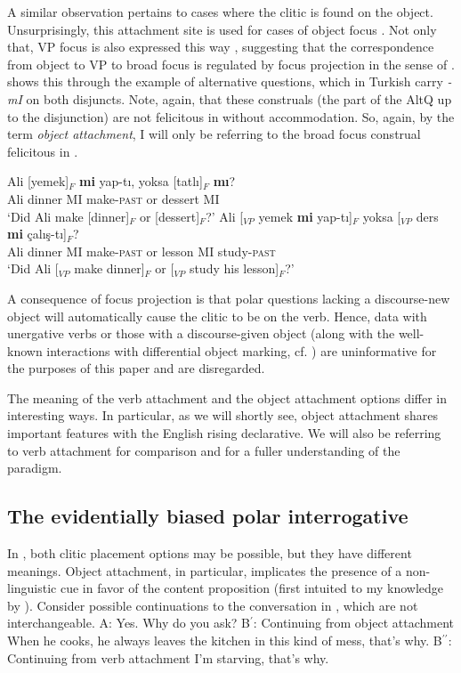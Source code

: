 \documentclass[output=paper,colorlinks,citecolor=brown]{langscibook}
\begin{document}
A similar observation pertains to cases where the clitic is found on the object. Unsurprisingly, this attachment site is used for cases of object focus . Not only that, VP focus is also expressed this way , suggesting that the correspondence from object to VP to broad focus is regulated by focus projection in the sense of \citet{selkirk95}.  shows this through the example of alternative questions, which in Turkish carry \textit{-mI} on both disjuncts. Note, again, that these construals (the part of the AltQ up to the disjunction) are not felicitous in  without accommodation. So, again, by the term \textit{object attachment}, I will only be referring to the broad focus construal felicitous in .

 \ea\label{ex:11:6}
 \ea\label{ex:11:6a}
 \gll Ali  [yemek]$_{F}$  \textbf{mi} yap-tı, yoksa [tatlı]$_{F}$ \textbf{mı}?\\
 Ali dinner MI  make-\textsc{past} or dessert MI\\
\glt `Did Ali make [dinner]$_F$ or [dessert]$_F$?' 
\ex\label{ex:11:6b}
\gll Ali [$_{VP}$ yemek \textbf{mi} yap-tı]$_{F}$ yoksa [$_{VP}$ ders \textbf{mi} \c{c}alış-tı]$_{F}$?\\
Ali {} dinner MI make-\textsc{past} or {} lesson MI study-\textsc{past}\\
\glt `Did Ali [$_{VP}$ make dinner]$_F$ or [$_{VP}$ study his lesson]$_F$?' 
\z
\z

 A consequence of focus projection is that polar questions lacking a discourse-new object will automatically cause the clitic to be on the verb. Hence, data with unergative verbs or those with a discourse-given object (along with the well-known interactions with differential object marking, cf. \citealt{ozge-indef}) are uninformative for the purposes of this paper and are disregarded.  

The meaning of the verb attachment and the object attachment options differ in interesting ways. In particular, as we will shortly see, object attachment shares important features with the English rising declarative. We will also be referring to verb attachment for comparison and for a fuller understanding of the paradigm. 

\subsection{The evidentially biased polar interrogative}\label{sec:11:2:2}

In , both clitic placement options may be possible, but they have different meanings. Object attachment, in particular, implicates the presence of a non-linguistic cue in favor of the content proposition (first intuited to my knowledge by \citealt{gokselkerslake}). Consider possible continuations to the conversation in , which are not interchangeable.
\ea\label{ex:11:7}
A: Yes. Why do you ask?
\sn B$^\prime$: \text{[}Continuing from object attachment\text{]} When he cooks, he always leaves the kitchen in this kind of mess, that's why.
\sn B$^{\prime\prime}$: \text{[}Continuing from verb attachment\text{]} I'm starving, that's why.
\z
\end{document}
